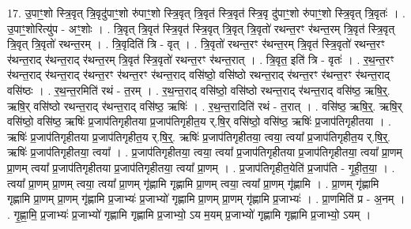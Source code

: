 \documentclass[17pt]{extarticle}
\begin{document}
17. उ॒पाꣳ॒॒शो स्त्रि॒वृत् त्रि॒वृदु॑पाꣳ॒॒शो रु॑पाꣳ॒॒शो स्त्रि॒वृत् त्रि॒वृत॑ स्त्रि॒वृत॑ स्त्रि॒वृ दु॑पाꣳ॒॒शो रु॑पाꣳ॒॒शो स्त्रि॒वृत् त्रि॒वृतः॑ । . उ॒पाꣳ॒॒शोरित्यु॑प - अꣳ॒॒शोः । . त्रि॒वृत् त्रि॒वृत॑ स्त्रि॒वृत॑ स्त्रि॒वृत् त्रि॒वृत् त्रि॒वृतो॑ रथन्त॒रꣳ र॑थन्त॒रम् त्रि॒वृत॑ स्त्रि॒वृत् त्रि॒वृत् त्रि॒वृतो॑ रथन्त॒रम् । . त्रि॒वृदिति॑ त्रि - वृत् । . त्रि॒वृतो॑ रथन्त॒रꣳ र॑थन्त॒रम् त्रि॒वृत॑ स्त्रि॒वृतो॑ रथन्त॒रꣳ र॑थन्त॒राद् र॑थन्त॒राद् र॑थन्त॒रम् त्रि॒वृत॑ स्त्रि॒वृतो॑ रथन्त॒रꣳ र॑थन्त॒रात् । . त्रि॒वृत॒ इति॑ त्रि - वृतः॑ । . र॒थ॒न्त॒रꣳ र॑थन्त॒राद् र॑थन्त॒राद् र॑थन्त॒रꣳ र॑थन्त॒रꣳ र॑थन्त॒राद् वसि॑ष्ठो॒ वसि॑ष्ठो रथन्त॒राद् र॑थन्त॒रꣳ र॑थन्त॒रꣳ र॑थन्त॒राद् वसि॑ष्ठः । . र॒थ॒न्त॒रमिति॑ रथं - त॒रम् । . र॒थ॒न्त॒राद् वसि॑ष्ठो॒ वसि॑ष्ठो रथन्त॒राद् र॑थन्त॒राद् वसि॑ष्ठ॒ ऋषि॒र्॒. ऋषि॒र् वसि॑ष्ठो रथन्त॒राद् र॑थन्त॒राद् वसि॑ष्ठ॒ ऋषिः॑ । . र॒थ॒न्त॒रादिति॑ रथं - त॒रात् । . वसि॑ष्ठ॒ ऋषि॒र्॒. ऋषि॒र् वसि॑ष्ठो॒ वसि॑ष्ठ॒ ऋषिः॑ प्र॒जाप॑तिगृहीतया प्र॒जाप॑तिगृहीत॒य र्.षि॒र् वसि॑ष्ठो॒ वसि॑ष्ठ॒ ऋषिः॑ प्र॒जाप॑तिगृहीतया । . ऋषिः॑ प्र॒जाप॑तिगृहीतया प्र॒जाप॑तिगृहीत॒य र्.षि॒र्॒. ऋषिः॑ प्र॒जाप॑तिगृहीतया॒ त्वया॒ त्वया᳚ प्र॒जाप॑तिगृहीत॒य र्.षि॒र्॒. ऋषिः॑ प्र॒जाप॑तिगृहीतया॒ त्वया᳚ । . प्र॒जाप॑तिगृहीतया॒ त्वया॒ त्वया᳚ प्र॒जाप॑तिगृहीतया प्र॒जाप॑तिगृहीतया॒ त्वया᳚ प्रा॒णम् प्रा॒णम् त्वया᳚ प्र॒जाप॑तिगृहीतया प्र॒जाप॑तिगृहीतया॒ त्वया᳚ प्रा॒णम् । . प्र॒जाप॑तिगृहीत॒येति॑ प्र॒जाप॑ति - गृ॒ही॒त॒या॒ । . त्वया᳚ प्रा॒णम् प्रा॒णम् त्वया॒ त्वया᳚ प्रा॒णम् गृ॑ह्णामि गृह्णामि प्रा॒णम् त्वया॒ त्वया᳚ प्रा॒णम् गृ॑ह्णामि । . प्रा॒णम् गृ॑ह्णामि गृह्णामि प्रा॒णम् प्रा॒णम् गृ॑ह्णामि प्र॒जाभ्यः॑ प्र॒जाभ्यो॑ गृह्णामि प्रा॒णम् प्रा॒णम् गृ॑ह्णामि प्र॒जाभ्यः॑ । . प्रा॒णमिति॑ प्र - अ॒नम् । . गृ॒ह्णा॒मि॒ प्र॒जाभ्यः॑ प्र॒जाभ्यो॑ गृह्णामि गृह्णामि प्र॒जाभ्यो॒ ऽय म॒यम् प्र॒जाभ्यो॑ गृह्णामि गृह्णामि प्र॒जाभ्यो॒ ऽयम् । \newline
\end{document}
